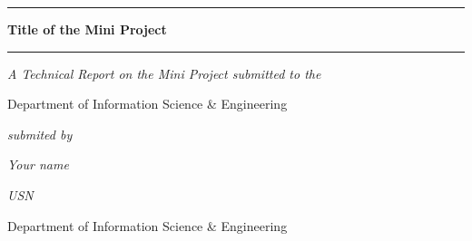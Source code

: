 %
\begin{titlepage}
	\begin{center}
	\hfill
	
   
	\rule[5pt]{\textwidth}{1.0pt} \par
{\Huge \textbf{Title of the Mini Project} \par}
\rule[5pt]{\textwidth}{1.0pt} \par

	\vspace*{1cm}
	{\large {}\centering\textit{A Technical Report on the Mini Project submitted to the }\par \vspace*{1cm}
		{\Large Department of Information Science \& Engineering} \par  
         \par	\vspace*{1cm}
			\vspace*{4cm}
			\textit{submited by} \par
			\vspace*{0.5cm}
			\textit{Your name} \par
			\textit{USN} \par
	    \vfill
	    \large{} {Department of Information Science \& Engineering}\par
		\small {}} 

	\vfill

	\end{center}
\end{titlepage}




